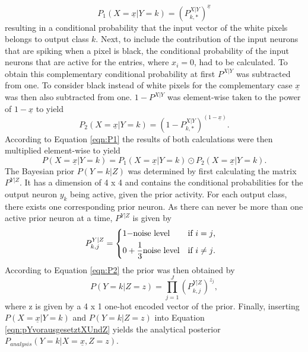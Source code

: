 \begin{equation}
\label{eqn:p1XvorausgesetztYMalX}
P_1(X = \underline{x}|Y = k) = (P^{X|Y}_{k,*})^{\underline{x}} 
\end{equation}
resulting in a conditional probability that the input vector of the white pixels belongs to output class $k$.
Next, to include the contribution of the input neurons that are spiking when a pixel is black, the conditional probability of the input neurons that are active for the entries, where $x_i = 0$, had to be calculated. To obtain this complementary conditional probability at first $P^{X|Y}$ was subtracted from one. To consider black instead of white pixels for the complementary case $\underline{x}$ was then also subtracted from one. $1 - P^{X|Y}$ was element-wise taken to the power of $1 - \underline{x}$ to yield
\begin{equation}
\label{eqn:p2minusXvorausgesetztYMalX}
P_2(X = \underline{x}|Y = k) = (1 - P^{X|Y}_{k,*})^{(1 - \underline{x})}.
\end{equation}
According to Equation \ref{eqn:P1} the results of both calculations were then multiplied element-wise to yield
\begin{equation}
\label{eqn:pXvorausgesetztY}
P(X = \underline{x}|Y = k) = P_1(X = \underline{x}|Y = k) \odot P_2(X = \underline{x}|Y = k).
\end{equation}
The Bayesian prior $P(Y=k|Z)$ was determined by first calculating the matrix $P^{Y|Z}$. It has a dimension of 4 x 4 and contains the conditional probabilities for the output neuron $y_k$ being active, given the prior activity. For each output class, there exists one corresponding prior neuron. As there can never be more than one active prior neuron at a time, $P^{Y|Z}$ is given by
\begin{equation}
\label{eqn:PYvorausgesetztZIf}
P_{k,j}^{Y|Z} = \begin{dcases*} 1 - $noise level$ & if $i = j$, \\
0 +  \frac{1}{3}  $noise level$ & \text{if $i \neq j$. } \end{dcases*}\end{equation} 
According to Equation \ref{eqn:P2} the prior was then obtained by
\begin{equation}
\label{eqn:pYvorausgesetztZ}
P(Y=k|Z=z) = \prod_{j=1}^J (P^{Y|Z}_{k,j})^{z_j},
\end{equation}
where z is given by a 4 x 1 one-hot encoded vector of the prior.
Finally, inserting $P(X = \underline{x}|Y = k)$ and $P(Y=k|Z=z)$ into Equation \ref{eqn:pYvorausgesetztXUndZ} yields the analytical posterior $P_{analysis}(Y = k|X = \underline{x}, Z = z)$.

